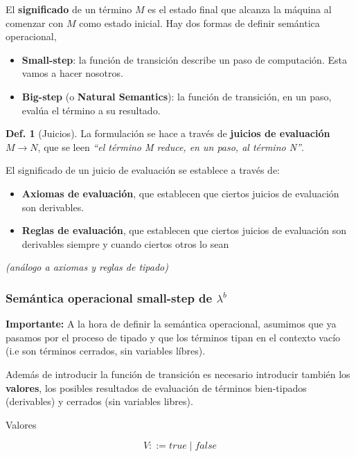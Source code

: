 \documentclass{report}
\theoremstyle{definition} %
\newtheorem{definition}{Def.}[chapter]
\newcommand{\lambdab}{\lambda^b}
\newcommand{\reduces}{\to}
\newcommand{\reduce}[2]{#1 \reduces #2}
\begin{document}
El \textbf{significado} de un término $M$ es el estado final que alcanza la
máquina al comenzar con $M$ como estado inicial. Hay dos formas de definir
semántica operacional,

\begin{itemize}
    \item \textbf{Small-step}: la función de transición describe un paso de
    computación. Esta vamos a hacer nosotros.
    \item \textbf{Big-step} (o \textbf{Natural Semantics}): la función de
    transición, en un paso, evalúa el término a su resultado.
\end{itemize}

\begin{definition}[Juicios]
    La formulación se hace a través de \textbf{juicios de evaluación}
    $\reduce{M}{N}$, que se leen \textit{``el término M reduce, en un paso, al
    término N''}.

    El significado de un juicio de evaluación se establece a través de:

    \begin{itemize}
        \item \textbf{Axiomas de evaluación}, que establecen que ciertos juicios
        de evaluación son derivables.
        \item \textbf{Reglas de evaluación}, que establecen que ciertos juicios
        de evaluación son derivables siempre y cuando ciertos otros lo sean
    \end{itemize}

    \textit{(análogo a axiomas y reglas de tipado)}
\end{definition}


\subsubsection{Semántica operacional small-step de $\lambdab$}

\textbf{Importante:} A la hora de definir la semántica operacional, asumimos que
ya pasamos por el proceso de tipado y que los términos tipan en el contexto
vacío (i.e son términos cerrados, sin variables líbres).

Además de introducir la función de transición es necesario introducir también
los \textbf{valores}, los posibles resultados de evaluación de términos
bien-tipados (derivables) y cerrados (sin variables libres).

Valores

\[
    V ::= true \mid false
\]
\end{document}
